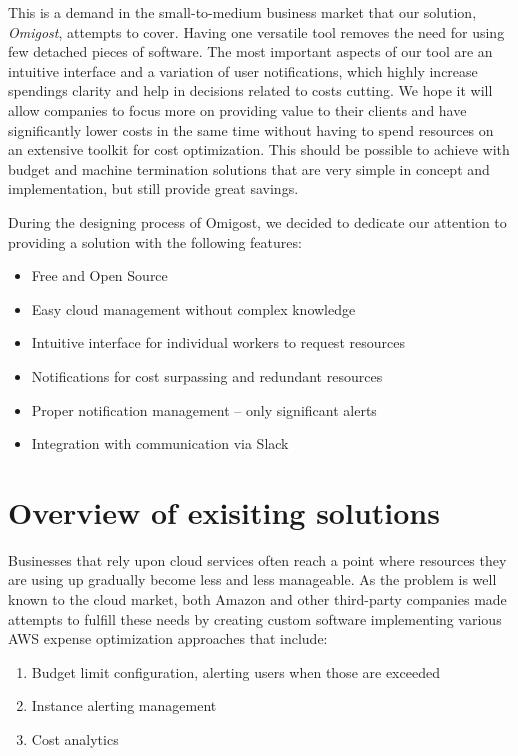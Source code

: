 \documentclass[licencjacka,en]{thesisclass}
\begin{document}
    This is a demand in the small-to-medium business market that our solution,
    \textit{Omigost}, attempts to cover.
    Having one versatile tool removes the need for using few detached pieces of software.
    The most important aspects of our tool are an intuitive interface and a variation
    of user notifications, which highly increase spendings clarity
    and help in decisions related to costs cutting.
    We hope it will allow companies to focus more on providing value to their clients
    and have significantly lower costs in the same time without having to spend resources
    on an extensive toolkit for cost optimization.
    This should be possible to achieve with budget and machine termination solutions
    that are very simple in concept and implementation, but still provide great savings.

    During the designing process of Omigost, we decided to dedicate our
    attention to providing a solution with the following features:
    \begin{itemize}
        \item Free and Open Source
        \item Easy cloud management without complex knowledge
        \item Intuitive interface for individual workers to request resources
        \item Notifications for cost surpassing and redundant resources
        \item Proper notification management -- only significant alerts
        \item Integration with communication via Slack
    \end{itemize}

    \section{Overview of exisiting solutions}

    Businesses that rely upon cloud services often reach a point where resources
    they are using up gradually become less and less manageable.
    As the problem is well known to the cloud market, both Amazon
    and other third-party companies made attempts to fulfill these needs
    by creating custom software implementing various AWS expense optimization approaches
    that include:

    \begin{enumerate}
        \item Budget limit configuration, alerting users when those are exceeded
        \item Instance alerting management
        \item Cost analytics
    \end{enumerate}
\end{document}
